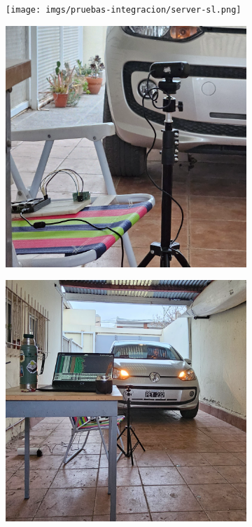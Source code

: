 \begin{figure}
    \centering
    \begin{subfigure}[b]{.3\textwidth}
        \centering
        \texttt{[image: imgs/pruebas-integracion/server-sl.png]}
    \end{subfigure}
    \begin{subfigure}[b]{.3\textwidth}
        \centering
        \includegraphics[width=\textwidth]{imgs/pruebas-integracion/sl-auto.png}
    \end{subfigure}
    \begin{subfigure}[b]{.3\textwidth}
        \centering
        \includegraphics[width=\textwidth]{imgs/pruebas-integracion/pruebas.png}
    \end{subfigure}


\end{figure}
